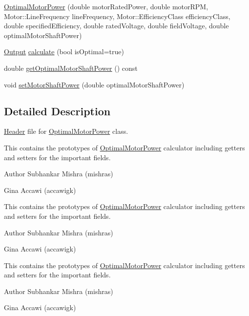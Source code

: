 \begin{DoxyCompactItemize}
\item 
\hyperlink{class_optimal_motor_power_a36017bbd359437ce77c1e18dc2377961}{Optimal\+Motor\+Power} (double motor\+Rated\+Power, double motor\+R\+PM, Motor\+::\+Line\+Frequency line\+Frequency, Motor\+::\+Efficiency\+Class efficiency\+Class, double specified\+Efficiency, double rated\+Voltage, double field\+Voltage, double optimal\+Motor\+Shaft\+Power)
\item 
\hyperlink{struct_optimal_motor_power_1_1_output}{Output} \hyperlink{class_optimal_motor_power_a8c33958584d48ee046fcd4d56258c3e2}{calculate} (bool is\+Optimal=true)
\item 
double \hyperlink{class_optimal_motor_power_a7d6e976abf406c54637d3b51e098d7c8}{get\+Optimal\+Motor\+Shaft\+Power} () const
\item 
void \hyperlink{class_optimal_motor_power_ada8a9e3caac34c54470ad13ffe7edf53}{set\+Motor\+Shaft\+Power} (double optimal\+Motor\+Shaft\+Power)
\end{DoxyCompactItemize}


\subsection{Detailed Description}
\hyperlink{class_header}{Header} file for \hyperlink{class_optimal_motor_power}{Optimal\+Motor\+Power} class. 

This contains the prototypes of \hyperlink{class_optimal_motor_power}{Optimal\+Motor\+Power} calculator including getters and setters for the important fields.

\begin{DoxyAuthor}{Author}
Subhankar Mishra (mishras) 

Gina Accawi (accawigk) 
\end{DoxyAuthor}


This contains the prototypes of \hyperlink{class_optimal_motor_power}{Optimal\+Motor\+Power} calculator including getters and setters for the important fields.

\begin{DoxyAuthor}{Author}
Subhankar Mishra (mishras) 

Gina Accawi (accawigk) 
\end{DoxyAuthor}


This contains the prototypes of \hyperlink{class_optimal_motor_power}{Optimal\+Motor\+Power} calculator including getters and setters for the important fields.

\begin{DoxyAuthor}{Author}
Subhankar Mishra (mishras) 

Gina Accawi (accawigk) 
\end{DoxyAuthor}


